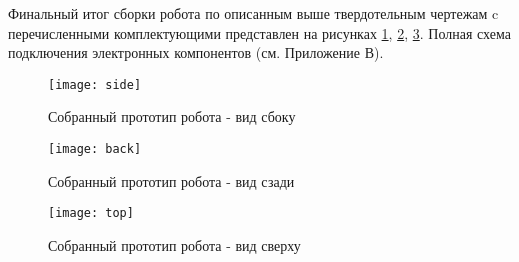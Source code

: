 Финальный итог сборки робота по описанным выше твердотельным чертежам c перечисленными комплектующими представлен на  рисунках \ref{side}, \ref{back}, \ref{top}. Полная схема подключения электронных компонентов (см. Приложение В).
\newpage
\begin{figure}[h!]
	\begin{center}
		\texttt{[image: side]}
		\caption{Собранный прототип робота - вид сбоку}
		\label{side}
	\end{center}
\end{figure}

\begin{figure}[h!]
	\begin{center}
		\texttt{[image: back]}
		\caption{Собранный прототип робота - вид сзади}
		\label{back}
	\end{center}
\end{figure}
\newpage
\begin{figure}[h!]
	\begin{center}
		\texttt{[image: top]}
		\caption{Собранный прототип робота - вид сверху}
		\label{top}
	\end{center}
\end{figure}